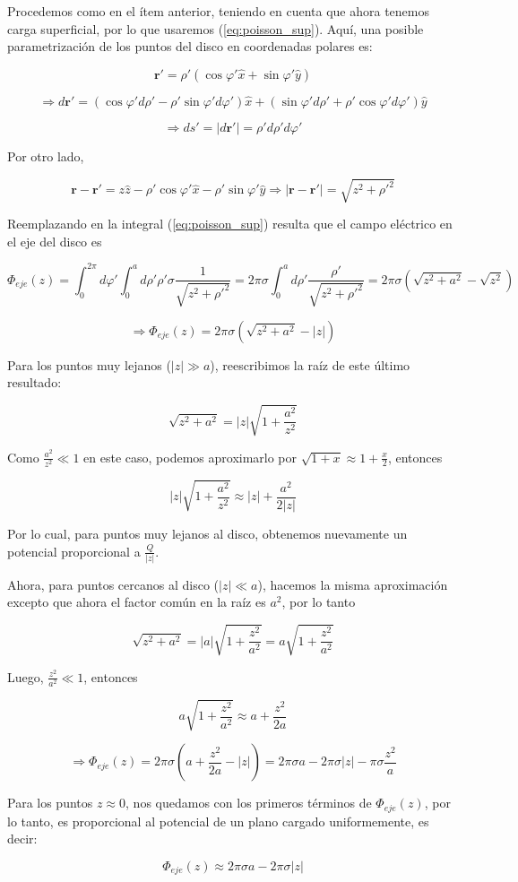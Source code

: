 \begin{itemize}
Procedemos como en el \'item anterior, teniendo en cuenta que ahora tenemos carga superficial, por lo que usaremos (\ref{eq:poisson_sup}). Aqu\'i, una posible parametrizaci\'on de los puntos del disco en coordenadas polares es:

$$\mathbf{r'} = \rho'(\cos \varphi' \hat{x} + \sin \varphi' \hat{y})$$

$$\Rightarrow d\mathbf{r'} = (\cos \varphi' d\rho' - \rho' \sin \varphi' d\varphi')\hat{x} + (\sin \varphi' d\rho' + \rho' \cos \varphi' d\varphi')\hat{y}$$


$$\Rightarrow ds' = |d\mathbf{r'}| = \rho' d\rho' d\varphi'$$

Por otro lado,

$$\mathbf{r} - \mathbf{r'} = z\hat{z} - \rho'\cos \varphi' \hat{x} - \rho'\sin \varphi' \hat{y} \Rightarrow |\mathbf{r} - \mathbf{r'}| = \sqrt{z^{2} + \rho'^{2}}$$

Reemplazando en la integral (\ref{eq:poisson_sup}) resulta que el campo el\'ectrico en el eje del disco es

$$\Phi_{eje}(z) = \int_{0}^{2\pi} d\varphi' \int_{0}^{a} d\rho' \rho' \sigma \frac{1}{\sqrt{z^{2} + \rho'^{2}}} = 2\pi \sigma \int_{0}^{a} d\rho' \frac{\rho'}{\sqrt{z^{2} + \rho'^{2}}} = 2\pi \sigma (\sqrt{z^{2} + a^{2}} - \sqrt{z^{2}})$$

$$ \Rightarrow \Phi_{eje}(z) = 2\pi \sigma (\sqrt{z^{2} + a^{2}} - |z|)$$

Para los puntos muy lejanos ($|z| \gg a$), reescribimos la ra\'iz de este \'ultimo resultado:

$$\sqrt{z^{2} + a^{2}} = |z|\sqrt{1 + \frac{a^{2}}{z^{2}}}$$

Como $\frac{a^{2}}{z^{2}} \ll 1$ en este caso, podemos aproximarlo por $\sqrt{1 + x} \approx 1 + \frac{x}{2}$, entonces

$$|z|\sqrt{1 + \frac{a^{2}}{z^{2}}} \approx |z| + \frac{a^{2}}{2|z|}$$

Por lo cual, para puntos muy lejanos al disco, obtenemos nuevamente un potencial proporcional a $\frac{Q}{|z|}$.\newline

Ahora, para puntos cercanos al disco ($|z| \ll a$), hacemos la misma aproximaci\'on excepto que ahora el factor com\'un en la ra\'iz es $a^{2}$, por lo tanto

$$\sqrt{z^{2} + a^{2}} = |a|\sqrt{1 + \frac{z^{2}}{a^{2}}} = a\sqrt{1 + \frac{z^{2}}{a^{2}}}$$

Luego, $\frac{z^{2}}{a^{2}} \ll 1$, entonces

$$a\sqrt{1 + \frac{z^{2}}{a^{2}}} \approx a + \frac{z^{2}}{2a}$$

$$\Rightarrow \Phi_{eje}(z) = 2\pi \sigma (a + \frac{z^{2}}{2a} - |z|) = 2\pi \sigma a - 2\pi \sigma |z| - \pi \sigma \frac{z^{2}}{a}$$

Para los puntos $z \approx 0$, nos quedamos con los primeros t\'erminos de $\Phi_{eje}(z)$, por lo tanto, es proporcional al potencial de un plano cargado uniformemente, es decir:

$$\Phi_{eje}(z) \approx 2\pi \sigma a - 2\pi \sigma |z|$$

\end{itemize}

